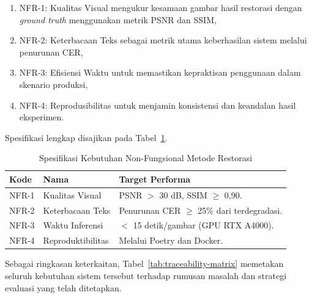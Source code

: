 \begin{enumerate}[label=\arabic*., leftmargin=*]
\begin{enumerate}[label=(\alph*), nosep]
    \item NFR-1: Kualitas Visual mengukur kesamaan gambar hasil restorasi dengan \textit{ground truth} menggunakan metrik PSNR dan SSIM,
    \item NFR-2: Keterbacaan Teks sebagai metrik utama keberhasilan sistem melalui penurunan CER,
    \item NFR-3: Efisiensi Waktu untuk memastikan kepraktisan penggunaan dalam skenario produksi,
    \item NFR-4: Reprodusibilitas untuk menjamin konsistensi dan keandalan hasil eksperimen.
\end{enumerate}

Spesifikasi lengkap disajikan pada Tabel~\ref{tab:non_functional_requirements}.

\begin{table}[htbp!]
    \centering
    \small
    \caption{Spesifikasi Kebutuhan Non-Fungsional Metode Restorasi}
    \label{tab:non_functional_requirements}
    \begin{tabular}{p{}p{}p{}}
        \toprule
        \textbf{Kode} & \textbf{Nama}    & \textbf{Target Performa}                         \\
        \midrule
        NFR-1         & Kualitas Visual  & PSNR $>$ 30 dB, SSIM $\geq$ 0,90.                \\
        \midrule
        NFR-2         & Keterbacaan Teks & Penurunan CER $\geq$ 25\% dari terdegradasi.     \\
        \midrule
        NFR-3         & Waktu Inferensi  & $<$ 15 detik/gambar (GPU RTX A4000).             \\
        \midrule
        NFR-4         & Reproduktibilitas  & Melalui Poetry dan Docker.             \\
        \bottomrule
    \end{tabular}
\end{table}
\end{enumerate}



Sebagai ringkasan keterkaitan, Tabel~\ref{tab:traceability-matrix} memetakan seluruh kebutuhan sistem tersebut terhadap rumusan masalah dan strategi evaluasi yang telah ditetapkan.

